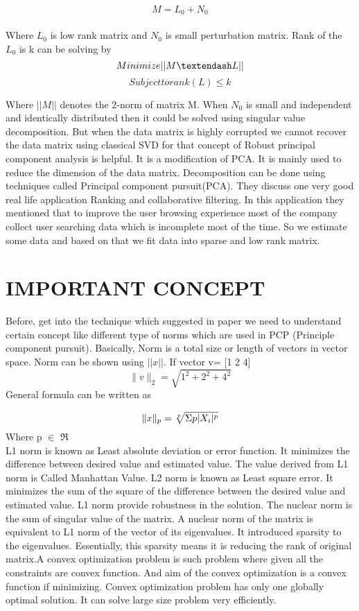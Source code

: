 \documentclass[journal, a4paper]{IEEEtran}
\begin{document}
	$$M = L_0 + N_0 $$\\
	Where $L_0$ is low rank matrix and $N_0$ is small perturbation matrix. Rank of the $L_0$ is k can be solving by
$$Minimize  || M \textendash L ||$$
$$ Subject to rank(L) \leq k$$

Where $|| M ||$ denotes the 2-norm of matrix M. When $N_0$ is small and independent and identically distributed then it could be solved using singular value decomposition.  But when the data matrix is highly corrupted we cannot recover the data matrix using classical SVD for that concept of Robust principal component analysis is helpful. It is a modification of PCA. It is mainly used to reduce the dimension of the data matrix. Decomposition can be done using techniques called Principal component pursuit(PCA). They discuss one very good real life application Ranking and collaborative filtering. In this application they mentioned that to improve the user browsing experience most of the company collect user searching data which is incomplete most of the time. So we estimate some data and based on that we fit data into sparse and low rank matrix. 

\section{IMPORTANT CONCEPT}
	Before, get into the technique which suggested in paper we need to understand certain concept like different type of norms which are used in PCP (Principle component pursuit). Basically, Norm is a total size or length of vectors in vector space. Norm can be shown using $|| x ||$. If vector v= [1 2 4] 
	$$ \lVert v \rVert_2 =\sqrt{1^2+2^2+4^2}$$
	General formula can be written as
	
	$$ \lVert x \rVert_p=\sqrt[p]{\Sigma p \arrowvert X_i\arrowvert^p} $$ Where p $\in$ $\Re$ \\
	
	L1 \textendash norm is known as Least absolute deviation or error function. It minimizes the difference between desired value and estimated value. The value derived from L1 norm is Called Manhattan Value.  L2 \textendash norm is known as Least square error. It minimizes the sum of the square of the difference between the desired value and estimated value. L1 norm provide robustness in the solution.
	The nuclear norm is the sum of singular value of the matrix. A nuclear norm of the matrix is equivalent to L1 \textendash norm of the vector of its eigenvalues. It introduced sparsity to the eigenvalues. Essentially, this sparsity means it is reducing the rank of original matrix.A convex optimization problem is such problem where given all the constraints are convex function. And aim of the convex optimization is a convex function if minimizing. Convex optimization problem has only one globally optimal solution. It can solve large size problem very efficiently.       
	
\end{document}
